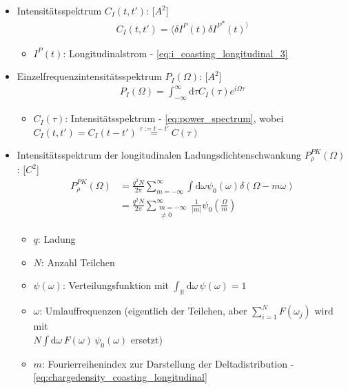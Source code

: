 \documentclass[12pt]{article}%
\begin{document}
\begin{itemize}
\item Intensitätsspektrum $C_I(t, t')$: [$A^2$]
\begin{align}  \label{eq:power_spectrum}
C_I(t, t') = \langle \delta I^P(t) \delta {I^P}^*(t)^ \rangle
\end{align}

	\begin{itemize}
		\item $I^P(t)$: Longitudinalstrom - \eqref{eq:i_coasting_longitudinal_3}
	\end{itemize}

\item Einzelfrequenzintensitätsspektrum $P_I(\Omega)$: [$A^2$]
\begin{align}
P_I(\Omega) = \int_{-\infty}^{\infty} \mathrm{d}\tau C_I(\tau) e^{i\Omega \tau}
\end{align}

	\begin{itemize}
		\item $C_I(\tau)$: Intensitätsspektrum - \eqref{eq:power_spectrum}, wobei $C_I(t, t') = C_I(t - t') \overset{\tau := t - t'}{=} C(\tau)$
	\end{itemize}

\item Intensitätsspektrum der longitudinalen Ladungsdichtenschwankung $P_\rho^{PK}(\Omega)$: [$C^2$]
\begin{subequations}
\begin{align}
	P_\rho^{PK}(\Omega) &= \frac{q^2N}{2\pi}\sum_{m=-\infty}^{\infty} \int \mathrm{d} \omega \psi_0(\omega) \delta(\Omega - m \omega) \\
	&= \frac{q^2N}{2\pi}\sum_{\substack{m=-\infty \\ \neq 0}}^{\infty} \frac{1}{|m|} \psi_0\left( \frac{\Omega}{m} \right)
\end{align}
\end{subequations}

	\begin{itemize}
	\item $q$: Ladung
	\item $N$: Anzahl Teilchen
	\item $\psi(\omega)$: Verteilungsfunktion mit $\int_{\mathbb{R}} \mathrm{d} \omega \, \psi(\omega) = 1$
	\item $\omega$: Umlauffrequenzen (eigentlich der Teilchen, aber $\sum_{i=1}^{N} F(\omega_j)$ wird mit \\ $N \int \mathrm{d}\omega \, F(\omega) \, \psi_0(\omega)$ ersetzt)
	\item $m$: Fourierreihenindex zur Darstellung der Deltadistribution  - \eqref{eq:chargedensity_coasting_longitudinal}


\end{itemize}
\end{itemize}
\end{document}
